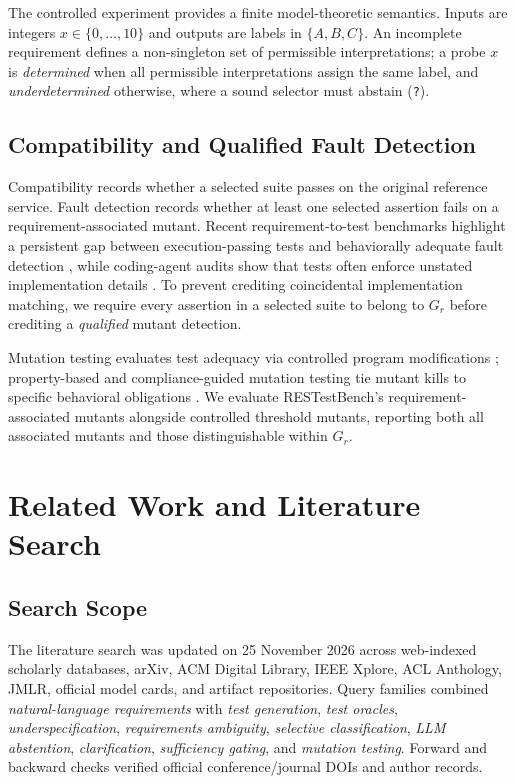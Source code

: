 \documentclass[sigconf,nonacm]{acmart}
\begin{document}
The controlled experiment provides a finite model-theoretic semantics. Inputs are integers $x\in\{0,\dots,10\}$ and outputs are labels in $\{A,B,C\}$. An incomplete requirement defines a non-singleton set of permissible interpretations; a probe $x$ is \emph{determined} when all permissible interpretations assign the same label, and \emph{underdetermined} otherwise, where a sound selector must abstain (\texttt{?}).

\subsection{Compatibility and Qualified Fault Detection}
Compatibility records whether a selected suite passes on the original reference service. Fault detection records whether at least one selected assertion fails on a requirement-associated mutant. Recent requirement-to-test benchmarks highlight a persistent gap between execution-passing tests and behaviorally adequate fault detection \cite{kogler2026bench,qi2026,shi2026}, while coding-agent audits show that tests often enforce unstated implementation details \cite{ding2026}. To prevent crediting coincidental implementation matching, we require every assertion in a selected suite to belong to $G_r$ before crediting a \emph{qualified} mutant detection.

Mutation testing evaluates test adequacy via controlled program modifications \cite{papadakis2019}; property-based and compliance-guided mutation testing tie mutant kills to specific behavioral obligations \cite{bartocci2023,harman2025ach}. We evaluate RESTestBench's requirement-associated mutants alongside controlled threshold mutants, reporting both all associated mutants and those distinguishable within $G_r$.

\section{Related Work and Literature Search}
\subsection{Search Scope}
The literature search was updated on 25 November 2026 across web-indexed scholarly databases, arXiv, ACM Digital Library, IEEE Xplore, ACL Anthology, JMLR, official model cards, and artifact repositories. Query families combined \emph{natural-language requirements} with \emph{test generation}, \emph{test oracles}, \emph{underspecification}, \emph{requirements ambiguity}, \emph{selective classification}, \emph{LLM abstention}, \emph{clarification}, \emph{sufficiency gating}, and \emph{mutation testing}. Forward and backward checks verified official conference/journal DOIs and author records.
\end{document}
